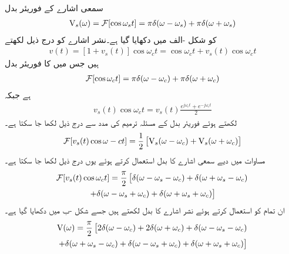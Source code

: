 سمعی اشارے کے فوریئر بدل
\begin{align}\label{مساوات_فوریئر_سمعی_اشارہ}
{\ensuremath{{\textup{V}}}}_s(\omega)=\mathcal{F}[\cos \omega_s t]=\pi \delta(\omega-\omega_s)+\pi\delta(\omega+\omega_s)
\end{align}
کو شکل -الف میں دکھایا گیا ہے۔نشر اشارے کو درج ذیل لکھتے
\begin{align*}
v(t)=[1+v_s(t)]\cos \omega_c t=\cos \omega_c t+v_s(t) \cos \omega_c t
\end{align*}
ہیں جس میں  کا فوریئر بدل
\begin{align}
\mathcal{F}[\cos \omega_c t]=\pi \delta(\omega-\omega_c)+\pi\delta(\omega+\omega_c)
\end{align}
ہے جبکہ
\begin{align*}
v_s(t)\cos \omega_c t=v_s(t) \frac{e^{j\omega_c t}+e^{-j\omega_c t}}{2}
\end{align*}
لکھتے ہوئے  فوریئر بدل کے مسئلہ ترمیم کی مدد سے درج ذیل لکھا جا سکتا ہے۔
\begin{align*}
\mathcal{F}[v_s(t)\cos \omega-c t]=\frac{1}{2}\left[{{\textup{V}}}_s(\omega-\omega_c)+{{\textup{V}}}_s(\omega+\omega_c)\right]
\end{align*}
مساوات  میں دیے سمعی اشارے کا بدل استعمال کرتے ہوئے یوں درج ذیل لکھا جا سکتا ہے۔
\begin{multline*}
\mathcal{F}[v_s(t)\cos \omega_c t]=\frac{\pi}{2}\left[\delta(\omega-\omega_s-\omega_c)+\delta(\omega+\omega_s-\omega_c)\right.\\
\left.+\delta(\omega-\omega_s+\omega_c)+\delta(\omega+\omega_s+\omega_c)\right]
\end{multline*}
ان تمام کو استعمال کرتے ہوئے نشر اشارے کا بدل لکھتے ہیں جسے شکل -ب میں دکھایا گیا ہے۔
\begin{multline}
{\ensuremath{{\textup{V}}}}(\omega)=\frac{\pi}{2}\left[2\delta(\omega-\omega_c)+2\delta(\omega+\omega_c)+\delta(\omega-\omega_s-\omega_c)\right.\\
\left.+\delta(\omega+\omega_s-\omega_c)+\delta(\omega-\omega_s+\omega_c)+\delta(\omega+\omega_s+\omega_c)\right]
\end{multline}
%
